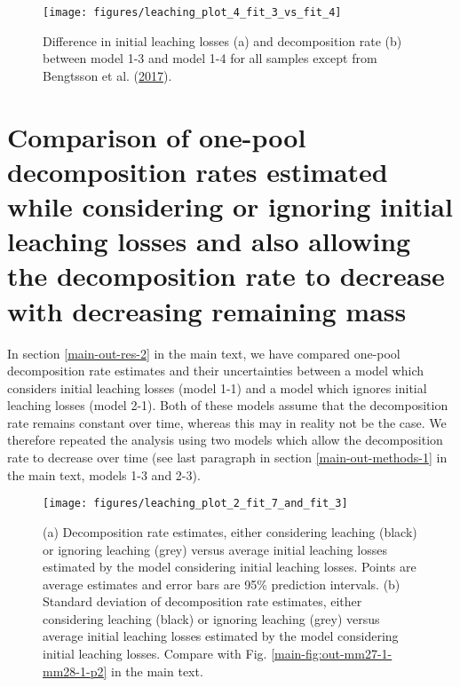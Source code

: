 \documentclass[
  12pt,
]{article}
\begin{document}
\begin{figure}[H]

{\centering \texttt{[image: figures/leaching\_plot\_4\_fit\_3\_vs\_fit\_4]} 

}

\caption{Difference in initial leaching losses (a) and decomposition rate (b) between model 1-3 and model 1-4 for all samples except from Bengtsson et al. (\protect\hyperlink{ref-Bengtsson.2017}{2017}).}\label{fig:sup-out-sdm-mm36-1-mm36-2-parameter-difference-p1-1}
\end{figure}

\hypertarget{sup-4}{%
\section{Comparison of one-pool decomposition rates estimated while considering or ignoring initial leaching losses and also allowing the decomposition rate to decrease with decreasing remaining mass}\label{sup-4}}

In section \ref{main-out-res-2} in the main text, we have compared one-pool decomposition rate estimates and their uncertainties between a model which considers initial leaching losses (model 1-1) and a model which ignores initial leaching losses (model 2-1). Both of these models assume that the decomposition rate remains constant over time, whereas this may in reality not be the case. We therefore repeated the analysis using two models which allow the decomposition rate to decrease over time (see last paragraph in section \ref{main-out-methods-1} in the main text, models 1-3 and 2-3).



\begin{figure}[H]

{\centering \texttt{[image: figures/leaching\_plot\_2\_fit\_7\_and\_fit\_3]} 

}

\caption{(a) Decomposition rate estimates, either considering leaching (black) or ignoring leaching (grey) versus average initial leaching losses estimated by the model considering initial leaching losses. Points are average estimates and error bars are 95\% prediction intervals. (b) Standard deviation of decomposition rate estimates, either considering leaching (black) or ignoring leaching (grey) versus average initial leaching losses estimated by the model considering initial leaching losses. Compare with Fig. \ref{main-fig:out-mm27-1-mm28-1-p2} in the main text.}\label{fig:sup-out-mm36-1-mm35-1-p3-1}
\end{figure}
\end{document}
